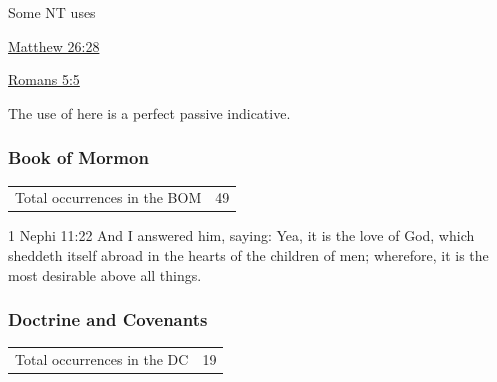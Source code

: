 				\begin{compactdesc}
					\item[Some NT uses] \textbf{}
						\begin{compactdesc}
							\item[{\hyperref[MATTHEW-26-28]{Matthew 26:28}}] 
							\item[{\hyperref[ROMANS-5-5]{Romans 5:5}}] 
								\begin{compactitem}
									\item The use of  here is a perfect passive indicative.
								\end{compactitem}
						\end{compactdesc}
				\end{compactdesc}
		
	\subsubsection{Book of Mormon} %
		\label{SHED-BOM}
	
		\begin{tabular}{ll}
			Total occurrences in the BOM & 49
		\end{tabular}
		
		\begin{compactdesc}
			\item[1 Nephi 11:22] And I answered him, saying: Yea, it is the love of God, which sheddeth itself abroad in the hearts of the children of men; wherefore, it is the most desirable above all things.
		\end{compactdesc}
		
	\subsubsection{Doctrine and Covenants} %
		\label{SHED-DC}
	
		\begin{tabular}{ll}
			Total occurrences in the DC & 19
		\end{tabular}
		
		

